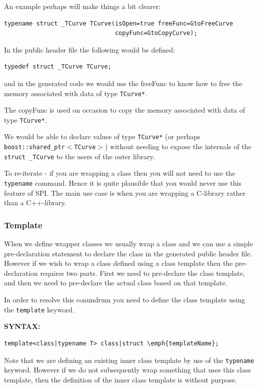 An example perhaps will make things a bit clearer:
\begin{verbatim}
typename struct _TCurve TCurve(isOpen=true freeFunc=GtoFreeCurve
                               copyFunc=GtoCopyCurve);
\end{verbatim}

In the public header file the following would be defined:\begin{verbatim}
typedef struct _TCurve TCurve;
\end{verbatim}

and in the generated code we would use the freeFunc to know how to free the memory associated with data of type \texttt{TCurve*}.

The copyFunc is used on occasion to copy the memory associated with data of type \texttt{TCurve*}.

We would be able to declare values of type \texttt{TCurve*} (or perhaps \texttt{boost::shared\_ptr$<$TCurve$>$}) without needing to expose the internals of the \texttt{struct \_TCurve} to the users of the outer library.

To re-iterate - if you are wrapping a class then you will not need to use the \texttt{typename} command. Hence it is quite plausible that you would never use this feature of SPI. The main use case is when you are wrapping a C-library rather than a C++-library.


\subsubsection{Template} \label{template}

When we define wrapper classes we usually wrap a class and we can use a simple pre-declaration statement to declare the class in the generated public header file.
However if we wish to wrap a class defined using a class template then the pre-declaration requires two parts.
First we need to pre-declare the class template, and then we need to pre-declare the actual class based on that template.

In order to resolve this conundrum you need to define the class template using the \texttt{template} keyword.


\textbf{SYNTAX:}
\nopagebreak
\begin{Verbatim}[commandchars=\\\{\}]
    template<class|typename T> class|struct \emph{templateName};
\end{Verbatim}
Note that we are defining an existing inner class template by use of the \texttt{typename} keyword.
However if we do not subsequently wrap something that uses this class template, then the definition of the inner class template is without purpose.


